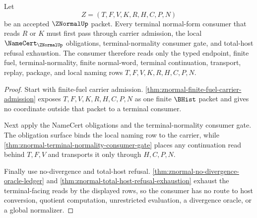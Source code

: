 \begin{theorem}
\label{thm:znormal-terminal-consumer-totality}
Let
$$
Z=(T,F,V,K,R,H,C,P,N)
$$
be an accepted $\ZNormalUp$ packet. Every terminal normal-form consumer that reads $R$ or $K$ must first pass through carrier admission, the local $\NameCert_{\ZNormalUp}$ obligations, terminal-normality consumer gate, and total-host refusal exhaustion. The consumer therefore reads only the typed endpoint, finite fuel, terminal-normality, finite normal-word, terminal continuation, transport, replay, package, and local naming rows $T,F,V,K,R,H,C,P,N$.
\end{theorem}
\begin{proof}
Start with finite-fuel carrier admission. \autoref{thm:znormal-finite-fuel-carrier-admission} exposes $T,F,V,K,R,H,C,P,N$ as one finite $\BHist$ packet and gives no coordinate outside that packet to a terminal consumer.

Next apply the NameCert obligations and the terminal-normality consumer gate. The obligation surface binds the local naming row to the carrier, while \autoref{thm:znormal-terminal-normality-consumer-gate} places any continuation read behind $T,F,V$ and transports it only through $H,C,P,N$.

Finally use no-divergence and total-host refusal. \autoref{thm:znormal-no-divergence-oracle-ledger} and \autoref{thm:znormal-total-host-refusal-exhaustion} exhaust the terminal-facing reads by the displayed rows, so the consumer has no route to host conversion, quotient computation, unrestricted evaluation, a divergence oracle, or a global normalizer.
\end{proof}

